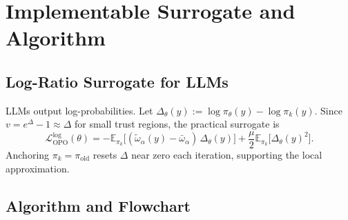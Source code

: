 \documentclass[11pt]{article}
\theoremstyle{definition}
\theoremstyle{remark}
\newcommand{\E}{\mathbb{E}}
\newcommand{\loss}{\mathcal{L}}
\newcommand{\pik}{\pi_k}
\begin{document}
\section{Implementable Surrogate and Algorithm}
\label{sec:implementation}

\subsection{Log-Ratio Surrogate for LLMs}

LLMs output log-probabilities. Let
$\Delta_\theta(y) := \log \pi_\theta(y) - \log \pik(y)$.
Since $v=e^{\Delta}-1\approx \Delta$ for small trust regions,
the practical surrogate is
\begin{equation}
\label{eq:opo_log_approx}
\boxed{
\loss_{\mathrm{OPO}}^{\log}(\theta)
=
-\E_{\pik}\big[(\tilde{\omega}_\alpha(y) - \bar{\omega}_\alpha)\,\Delta_\theta(y)\big]
+
\frac{\mu}{2}\E_{\pik}\big[\Delta_\theta(y)^2\big].
}
\end{equation}
Anchoring $\pik=\pi_{\mathrm{old}}$ resets $\Delta$ near zero each iteration, supporting the local approximation.

\subsection{Algorithm and Flowchart}
\end{document}
